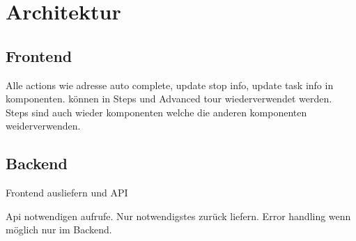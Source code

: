 \section{Architektur}

\subsection{Frontend}
Alle actions wie adresse auto complete, update stop info, update task info in komponenten. können in Steps und Advanced tour wiederverwendet werden. Steps sind auch wieder komponenten welche die anderen komponenten weiderverwenden.

\subsection{Backend}
Frontend ausliefern und API

Api notwendigen aufrufe. Nur notwendigstes zurück liefern. Error handling wenn möglich nur im Backend.
